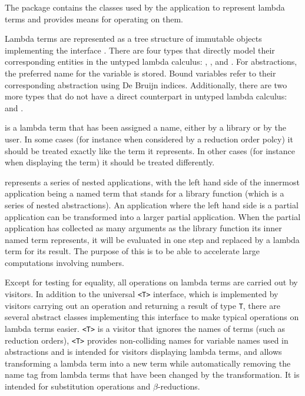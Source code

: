 The \texttt{} package contains the classes used by the application to
represent lambda terms and provides means for operating on them.

Lambda terms are represented as a tree structure of immutable objects
implementing the interface \texttt{}. There are four types that
directly model their corresponding entities in the untyped lambda calculus:
\texttt{}, \texttt{}, \texttt{} and
\texttt{}. For abstractions, the preferred name for the variable is stored.
Bound variables refer to their corresponding abstraction using De Bruijn indices.
Additionally, there are two more types that do not have
a direct counterpart in untyped lambda calculus: \texttt{} and
\texttt{}.

\texttt{} is a lambda term that has been assigned a name, either by a
library or by the user. In some cases (for instance when considered by a
reduction order polcy) it should be treated exactly like the term it
represents. In other cases (for instance when displaying the term) it should be
treated differently.

\texttt{} represents a series of nested applications, with
the left hand side of the innermost application being a named term that stands
for a library function (which is a series of nested abstractions). An
application where the left hand side is a partial application can be
transformed into a larger partial application. When the partial application
has collected as many arguments as the library function its inner named
term represents, it will be evaluated in one step and replaced by a lambda
term for its result. The purpose of this is to be able to accelerate large
computations involving numbers.

Except for testing for equality, all operations on lambda terms are carried out
by visitors. In addition to the universal \texttt{<T>} interface, which
is implemented by visitors carrying out an operation and returning a result of type
\texttt{T}, there are several abstract classes implementing this interface to make
typical operations on lambda terms easier. \texttt{<T>} is a
visitor that ignores the names of terms (such as reduction orders),
\texttt{<T>} provides non-colliding names for variable names
used in abstractions and is intended for visitors displaying lambda terms, and
\texttt{} allows transforming a lambda term into a new term while
automatically removing the name tag from lambda terms that have been changed by
the transformation. It is intended for substitution operations and $\beta$-reductions.

